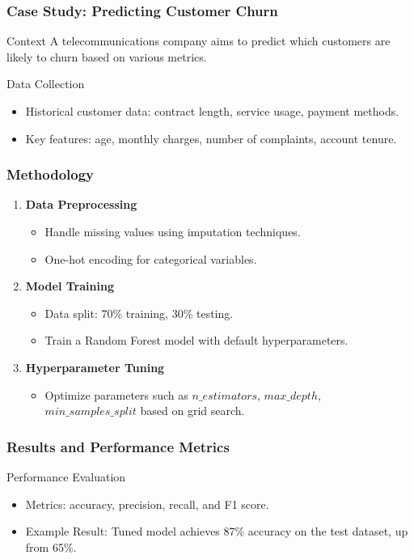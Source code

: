 \documentclass[aspectratio=169]{beamer}
\begin{document}
\begin{frame}
    \frametitle{Case Study: Predicting Customer Churn}
    \begin{block}{Context}
        A telecommunications company aims to predict which customers are likely to churn based on various metrics.
    \end{block}
    \begin{block}{Data Collection}
        \begin{itemize}
            \item Historical customer data: contract length, service usage, payment methods.
            \item Key features: age, monthly charges, number of complaints, account tenure.
        \end{itemize}
    \end{block}
\end{frame}

\begin{frame}
    \frametitle{Methodology}
    \begin{enumerate}
        \item \textbf{Data Preprocessing}
            \begin{itemize}
                \item Handle missing values using imputation techniques.
                \item One-hot encoding for categorical variables.
            \end{itemize}
        \item \textbf{Model Training}
            \begin{itemize}
                \item Data split: 70\% training, 30\% testing.
                \item Train a Random Forest model with default hyperparameters.
            \end{itemize}
        \item \textbf{Hyperparameter Tuning}
            \begin{itemize}
                \item Optimize parameters such as $n\_estimators$, $max\_depth$, $min\_samples\_split$ based on grid search.
            \end{itemize}
    \end{enumerate}
\end{frame}

\begin{frame}
    \frametitle{Results and Performance Metrics}
    \begin{block}{Performance Evaluation}
        \begin{itemize}
            \item Metrics: accuracy, precision, recall, and F1 score.
            \item Example Result: Tuned model achieves 87\% accuracy on the test dataset, up from 65\%.
        \end{itemize}
    \end{block}
\end{frame}
\end{document}
